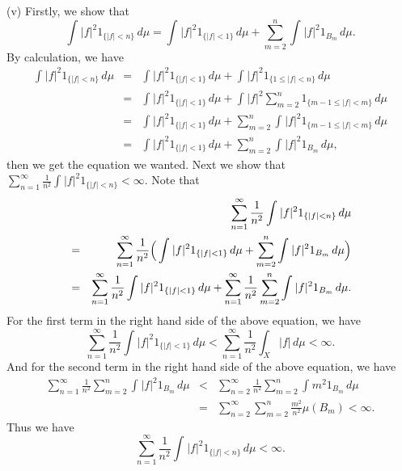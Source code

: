 \documentclass[12pt,a4paper]{ctexart}
\begin{document}
(v) Firstly, we show that 
\begin{equation*}
    \int_{}^{} |f|^{2} 1_{\{|f| < n\}} \, d \mu = \int_{}^{} |f|^{2} 1_{\{|f| < 1\}} \, d \mu + \sum_{m=2}^{n} \int_{}^{} |f|^{2} 1_{B_{m}} \, d \mu.
\end{equation*}
By calculation, we have
\begin{eqnarray*}
    \int_{}^{} |f|^{2} 1_{\{|f| < n\}} \, d \mu & = & \int_{}^{} |f|^{2} 1_{\{|f| < 1\}} \, d \mu + \int_{}^{} |f|^{2} 1_{\{1 \leq |f| < n\}} \, d \mu \\
    & = & \int_{}^{} |f|^{2} 1_{\{|f| < 1\}} \, d \mu + \int_{}^{} |f|^{2} \sum_{m=2}^{n} 1_{\{m-1 \leq |f| < m\}} \, d \mu \\
    & = & \int_{}^{} |f|^{2} 1_{\{|f| < 1\}} \, d \mu + \sum_{m=2}^{n} \int_{}^{} |f|^{2}  1_{\{m-1 \leq |f| < m\}} \, d \mu \\
    & = & \int_{}^{} |f|^{2} 1_{\{|f| < 1\}} \, d \mu + \sum_{m=2}^{n} \int_{}^{} |f|^{2} 1_{B_{m}} \, d \mu,
\end{eqnarray*}
then we get the equation we wanted. Next we show that $\sum_{n=1}^{\infty} \frac{1}{n^{2}} \int_{}^{} |f|^{2} 1_{\{|f| < n\}} < \infty $. Note that
\begin{eqnarray*}
   &  & \sum_{n=1}^{\infty} \frac{1}{n^{2}} \int_{}^{} |f|^{2} 1_{\{|f| < n\}} \, d \mu  \\
    & = &  \sum_{n=1}^{\infty} \frac{1}{n^{2}} \Big{(} \int_{}^{} |f|^{2} 1_{\{|f| < 1\}} \, d \mu + \sum_{m=2}^{n} \int_{}^{} |f|^{2} 1_{B_{m}} \, d \mu \Big{)} \\
    & = & \sum_{n=1}^{\infty} \frac{1}{n^{2}} \int_{}^{} |f|^{2} 1_{\{|f| < 1\}} \, d \mu + \sum_{n=1}^{\infty} \frac{1}{n^{2}} \sum_{m=2}^{n} \int_{}^{} |f|^{2} 1_{B_{m}} \, d \mu.
\end{eqnarray*}
For the first term in the right hand side of the above equation, we have
\begin{equation*}
    \sum_{n=1}^{\infty} \frac{1}{n^{2}} \int_{}^{} |f|^{2} 1_{\{|f| < 1\}} \, d \mu < \sum_{n=1}^{\infty} \frac{1}{n^{2}} \int_{X}^{} |f| \, d \mu  < \infty.
\end{equation*}
And for the second term in the right hand side of the above equation, we have
\begin{eqnarray*}
    \sum_{n=1}^{\infty} \frac{1}{n^{2}} \sum_{m=2}^{n} \int_{}^{} |f|^{2} 1_{B_{m}} \, d \mu & < & \sum_{n=2}^{\infty} \frac{1}{n^{2}} \sum_{m=2}^{n} \int_{}^{} m^{2} 1_{B_{m}} \, d \mu \\
   & = & \sum_{n=2}^{\infty} \sum_{m=2}^{n} \frac{m^{2}}{n^{2}} \mu(B_{m}) < \infty.
\end{eqnarray*}
Thus we have
\begin{equation*}
    \sum_{n=1}^{\infty} \frac{1}{n^{2}} \int_{}^{} |f|^{2} 1_{\{|f| < n\}} \, d \mu  < \infty.
\end{equation*}
\end{document}
